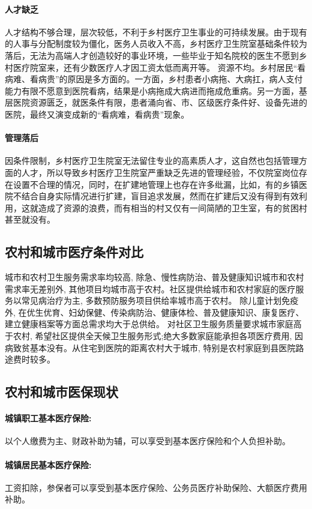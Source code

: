 \documentclass[11pt,twoside,a4paper]{article}
\begin{document}
		\paragraph{人才缺乏}
		人才结构不够合理，层次较低，不利于乡村医疗卫生事业的可持续发展。由于现有的人事与分配制度较为僵化，医务人员收入不高，乡村医疗卫生院室基础条件较为落后，无法为高端人才创造较好的事业环境，一些毕业于知名院校的医生不愿到乡村医疗院室来，还有少数医疗人才因工资太低而离开等。
		资源不均。乡村居民“看病难、看病贵”的原因是多方面的。一方面，乡村患者小病拖、大病扛，病人支付能力有限不愿意到医院看病，结果是小病拖成大病进而拖成危重病。另一方面，基层医院资源匮乏，就医条件有限，患者涌向省、市、区级医疗条件好、设备先进的医院，最终又演变成新的“看病难，看病贵”现象。
		\paragraph{管理落后}
		因条件限制，乡村医疗卫生院室无法留住专业的高素质人才，这自然也包括管理方面的人才，所以导致乡村医疗卫生院室严重缺乏先进的管理经验，不仅院室岗位存在设置不合理的情况，同时，在扩建地管理上也存在许多纰漏，比如，有的乡镇医院不结合自身实际情况进行扩建，盲目追求发展，然而在扩建后又没有得到有效利用，这就造成了资源的浪费，而有相当的村又仅有一间简陋的卫生室，有的贫困村甚至就没有。
		
		\subsection{农村和城市医疗条件对比}
		城市和农村卫生服务需求率均较高, 除急、慢性病防治、普及健康知识城市和农村需求率无差别外, 其他项目均城市高于农村。社区提供给城市和农村家庭的医疗服务以常见病治疗为主, 多数预防服务项目供给率城市高于农村。 除儿童计划免疫外, 在优生优育、妇幼保健、传染病防治、健康体检、普及健康知识、康复医疗、建立健康档案等方面总需求均大于总供给。 对社区卫生服务质量要求城市家庭高于农村, 希望社区提供全天候卫生服务形式;绝大多数家庭能承担各项医疗费用, 因病致贫基本没有。从住宅到医院的距离农村大于城市, 特别是农村家庭到县医院路途费时较多。
		
		\subsection{农村和城市医保现状}
		\paragraph{城镇职工基本医疗保险:}
		以个人缴费为主、财政补助为辅，可以享受到基本医疗保险和个人负担补助。
		\paragraph{城镇居民基本医疗保险:}
		工资扣除，参保者可以享受到基本医疗保险、公务员医疗补助保险、大额医疗费用补助。
\end{document}
